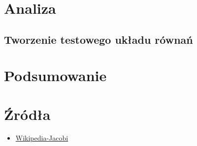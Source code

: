 \documentclass{article}
\begin{document}
\section{Analiza}
\subsection{Tworzenie testowego układu równań}

\section{Podsumowanie}
\section{Źródła}
\begin{itemize}
	\item \href{https://en.wikipedia.org/wiki/Jacobi_method}{Wikipedia-Jacobi}
\end{itemize}
\end{document}
